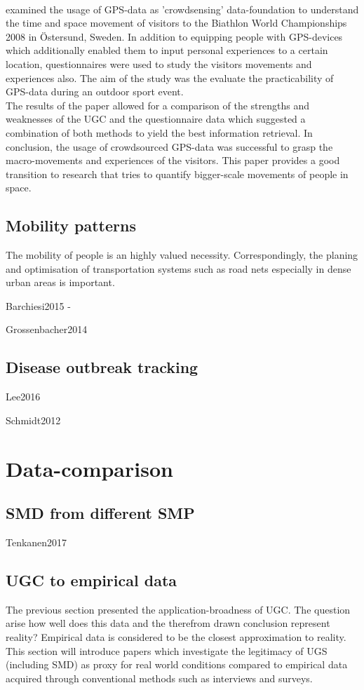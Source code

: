 \paragraph*{\textcite{Pettersson2011}} examined the usage of GPS-data as 'crowdsensing' data-foundation to understand the time and space movement of visitors to the Biathlon World Championships 2008 in \"Ostersund, Sweden. In addition to equipping people with GPS-devices which additionally enabled them to input personal experiences to a certain location, questionnaires were used to study the visitors movements and experiences also. The aim of the study was the evaluate the practicability of GPS-data during an outdoor sport event. \\
The results of the paper allowed for a comparison of the strengths and weaknesses of the UGC and the questionnaire data which suggested a combination of both methods to yield the best information retrieval. In conclusion, the usage of crowdsourced GPS-data was successful to grasp the macro-movements and experiences of the visitors. This paper provides a good transition to research that tries to quantify bigger-scale movements of people in space.

\subsection{Mobility patterns}
The mobility of people is an highly valued necessity. Correspondingly, the planing and optimisation of transportation systems such as road nets especially in dense urban areas is important. 


Barchiesi2015 - 

Grossenbacher2014

\subsection{Disease outbreak tracking}
Lee2016

Schmidt2012

\section{Data-comparison} \label{data_comparison_SotA}
\subsection{SMD from different SMP} \label{SMP_vs_SMP}
Tenkanen2017

\subsection{UGC to empirical data} \label{ugc_vs_empirical}
The previous section presented the application-broadness of UGC. The question arise how well does this data and the therefrom drawn conclusion represent reality? Empirical data is considered to be the closest approximation to reality. This section will introduce papers which investigate the legitimacy of UGS (including SMD) as proxy for real world conditions compared to empirical data acquired through conventional methods such as interviews and surveys.

